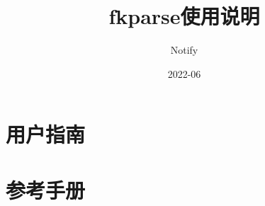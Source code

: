 \documentclass[a4paper,oneside,12pt]{book}
\begin{document}
\author{Notify}
\title{fkparse使用说明}
\date{2022-06}

\frontmatter
\maketitle
\tableofcontents

\mainmatter

\part{用户指南}








\part{参考手册}









\backmatter
\end{document}
